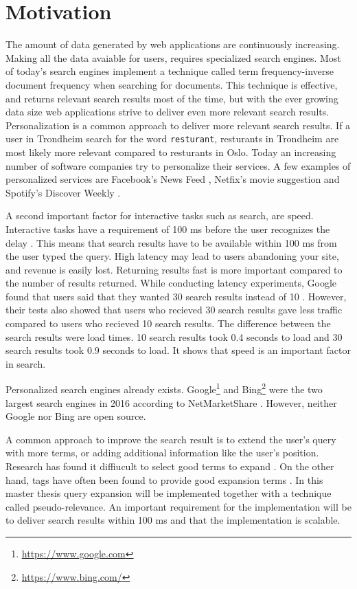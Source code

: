 \section{Motivation}
The amount of data generated by web applications are continuously increasing.
Making all the data avaiable for users, requires specialized search engines.
Most of today's search engines implement a technique called term frequency-inverse document frequency when searching for documents.
This technique is effective, and returns relevant search results most of the time,
but with the ever growing data size web applications strive to deliver even more relevant search results.
Personalization is a common approach to deliver more relevant search results.
If a user in Trondheim search for the word \texttt{resturant},
resturants in Trondheim are most likely more relevant compared to resturants in Oslo.
Today an increasing number of software companies try to personalize their services.
A few examples of personalized services are Facebook's News Feed \cite{facebook},
Netfix's movie suggestion \cite{netflix-recommendation} and Spotify's Discover Weekly \cite{spotify}.

A second important factor for interactive tasks such as search, are speed.
Interactive tasks have a requirement of 100 ms before the user recognizes the delay \cite{google-latency}.
This means that search results have to be available within 100 ms from the user typed the query.
High latency may lead to users abandoning your site, and revenue is easily lost.
Returning results fast is more important compared to the number of results returned.
While conducting latency experiments, Google found that users said that they wanted 30 search results instead of 10 \cite{google-marissa}.
However,
their tests also showed that users who recieved 30 search results gave less traffic compared to users who recieved 10 search results.
The difference between the search results were load times.
10 search results took 0.4 seconds to load and 30 search results took 0.9 seconds to load.
It shows that speed is an important factor in search.

Personalized search engines already exists.
Google\footnote{\url{https://www.google.com}} and Bing\footnote{\url{https://www.bing.com/}}
were the two largest search engines in 2016 according to NetMarketShare \cite{search-engine-rank}.
However, neither Google nor Bing are open source.

A common approach to improve the search result is to extend the user's query with more terms,
or adding additional information like the user's position.
Research has found it diffiucult to select good terms to expand \cite{pseudo-relevance-invalid}.
On the other hand, tags have often been found to provide good expansion terms \cite{ir-hashtag}.
In this master thesis query expansion will be implemented together with a technique called pseudo-relevance.
An important requirement for the implementation will be to deliver search results within 100 ms and that the implementation is scalable.

